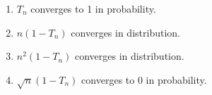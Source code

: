 \begin{enumerate}[label=\thesection.\arabic*.,ref=\thesection.\theenumi]
\begin{enumerate}
    \item $T_{n}$ converges to 1 in probability.
    \item $n(1-T_{n})$ converges in distribution.
    \item $n^{2}(1-T_{n})$ converges in distribution.
    \item $\sqrt{n}(1-T_{n})$ converges to 0 in probability.
\end{enumerate}
%
\solution



%
\end{enumerate}